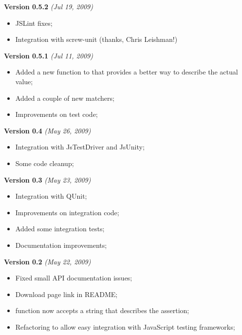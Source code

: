 \documentclass[letterpaper,10pt,english]{sphinxmanual}
\begin{document}
\textbf{Version 0.5.2} \emph{(Jul 19, 2009)}
\begin{itemize}
\item {} 
JSLint fixes;

\item {} 
Integration with screw-unit (thanks, Chris Leishman!)

\end{itemize}

\textbf{Version 0.5.1} \emph{(Jul 11, 2009)}
\begin{itemize}
\item {} 
Added a new function to {\hyperref[modules/jshamcrest:JsHamcrest.SimpleMatcher]{}} that provides a
better way to describe the actual value;

\item {} 
Added a couple of new matchers;

\item {} 
Improvements on test code;

\end{itemize}

\textbf{Version 0.4} \emph{(May 26, 2009)}
\begin{itemize}
\item {} 
Integration with JsTestDriver and JsUnity;

\item {} 
Some code cleanup;

\end{itemize}

\textbf{Version 0.3} \emph{(May 23, 2009)}
\begin{itemize}
\item {} 
Integration with QUnit;

\item {} 
Improvements on integration code;

\item {} 
Added some integration tests;

\item {} 
Documentation improvements;

\end{itemize}

\textbf{Version 0.2} \emph{(May 22, 2009)}
\begin{itemize}
\item {} 
Fixed small API documentation issues;

\item {} 
Download page link in README;

\item {} 
{\hyperref[modules/operator:JsHamcrest.Operators.assert]{}} function now accepts a string that
describes the assertion;

\item {} 
Refactoring to allow easy integration with JavaScript testing frameworks;

\end{itemize}
\end{document}
